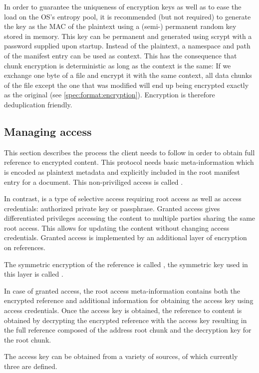 In order to guarantee the uniqueness of encryption keys as well as to ease the load on the OS's entropy pool, it is recommended (but not required) to generate the key as the MAC of the plaintext using a (semi-) permanent random key stored in memory. 
This key can be permanent and generated using scrypt with a password supplied upon startup. Instead of the plaintext, a namespace and path of the manifest entry can be used as context.
This has the consequence that chunk encryption is deterministic as long as the context is the same: If we exchange one byte of a file and encrypt it with the same context, all data chunks of the file except the one that was modified will end up being encrypted exactly as the original (see \ref{spec:format:encryption}). Encryption is therefore deduplication friendly. 


\subsection{Managing access}\label{sec:managing-access}

This section describes the process the client needs to follow in order to obtain full reference to encrypted content. This protocol needs basic meta-information which is encoded as plaintext metadata and explicitly included in the root manifest entry for a document. This non-priviliged access is called .

In contrast,  is a type of selective access requiring root access as well as access credentials: authorized private key or passphrase. Granted access gives differentiated privileges accessing the content to multiple parties sharing the same root access. This allows for updating the content without changing access credentials. Granted access is implemented by an additional layer of encryption on references.

The symmetric encryption of the reference is called , the symmetric key used in this layer is called
.

In case of granted access, the root access meta-information contains both the encrypted reference and additional information for obtaining the access key using access credentials. Once the access key is obtained, the reference to content is obtained by decrypting the encrypted reference with the access key resulting in the full reference composed of the address root chunk and the decryption key for the root chunk. 

The access key can be obtained from a variety of sources, of which currently three are defined.

